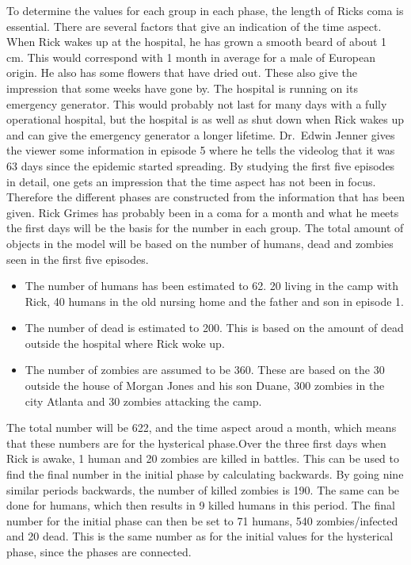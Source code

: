 \documentclass[%
twoside,                 %
final,                   %
chapterprefix=true,      %
open=right               %
10pt]{book}
\begin{document}
To determine the values for each group in each phase, the length of Ricks coma is essential. There are several factors that give an indication of the time aspect. When Rick wakes up at the hospital, he has grown a smooth beard of about 1 cm. This would correspond with 1 month in average for a male of European origin. He also has some flowers that have dried out. These also give the impression that some weeks have gone by. The hospital is running on its emergency generator. This would probably not last for many days with a fully operational hospital, but the hospital is as well as shut down when Rick wakes up and can give the emergency generator a longer lifetime. Dr.~Edwin Jenner gives the viewer some information in episode 5 where he tells the videolog that it was 63 days since the epidemic started spreading. By studying the first five episodes in detail, one gets an impression that the time aspect has not been in focus. Therefore the different phases are constructed from the information that has been given. Rick Grimes has probably been in a coma for a month and what he meets the first days will be the basis for the number in each group. The total amount of objects in the model will be based on the number of humans, dead and zombies seen in the first five episodes. 
\begin{itemize}
 \item The number of humans has been estimated to 62. 20 living in the camp with Rick, 40 humans in the old nursing home and the father and son in episode 1. 

 \item The number of dead is estimated to 200. This is based on the amount of dead outside the hospital where Rick woke up. 

 \item The number of zombies are assumed to be 360. These are based on the 30 outside the house of Morgan Jones and his son Duane, 300 zombies in the city Atlanta and 30 zombies attacking the camp. 
\end{itemize}

\noindent
The total number will be 622, and the time aspect aroud a month, which means that these numbers are for the hysterical phase.Over the three first days when Rick is awake, 1 human and 20 zombies are killed in battles. This can be used to find the final number in the initial phase by calculating backwards. By going nine similar periods backwards, the number of killed zombies is 190. The same can be done for humans, which then results in 9 killed humans in this period. The final number for the initial phase can then be set to 71 humans, 540 zombies/infected and 20 dead. This is the same number as for the initial values for the hysterical phase, since the phases are connected.
\end{document}
